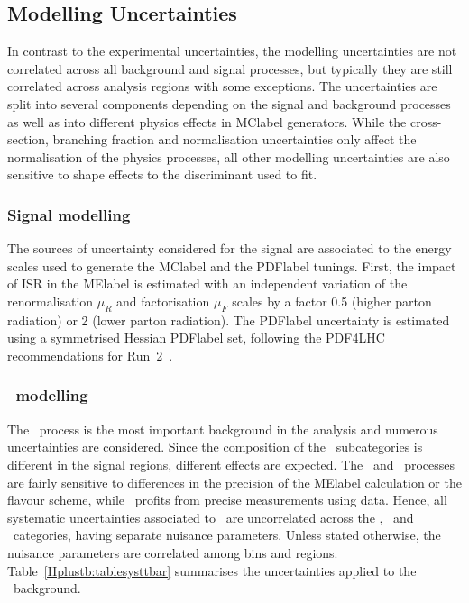 \subsection{Modelling Uncertainties}
In contrast to the experimental uncertainties, the modelling uncertainties are not correlated across all background and signal processes, but typically they are still correlated across analysis regions with some exceptions. The uncertainties are split into several components depending on the signal and background processes as well as into different physics effects in \acrshort{MClabel} generators. While the cross-section, branching fraction and normalisation uncertainties only affect the normalisation of the physics processes, all other modelling uncertainties are also sensitive to shape effects to the discriminant used to fit.


\subsubsection{Signal modelling}

The sources of uncertainty considered for the signal are associated to the energy scales used to generate the \acrshort{MClabel} and the \acrshort{PDFlabel} tunings. First, the impact of ISR in the \acrshort{MElabel} is estimated with an independent variation of the renormalisation $\mu_R$ and factorisation $\mu_F$ scales by a factor 0.5 (higher parton radiation) or 2 (lower parton radiation). The \acrshort{PDFlabel} uncertainty is estimated using a symmetrised Hessian \acrshort{PDFlabel} set, following the PDF4LHC recommendations for Run~2~\cite{Butterworth_2016}.

\subsubsection{\ttbar\ modelling}
\label{Hplustb:Sectionttbarmodelling}
The \ttbar\ process is the most important background in the analysis and numerous uncertainties are considered. Since the composition of the \ttbar\ subcategories is different in the signal regions, different effects are expected. The \ttb\ and \ttc\ processes are fairly sensitive to differences in the precision of the \acrshort{MElabel} calculation or the flavour scheme, while \ttl\ profits from precise measurements using data. Hence, all systematic uncertainties associated to \ttbar\ are uncorrelated across the \ttb, \ttc\ and \ttl\ categories, having separate nuisance parameters. Unless stated otherwise, the nuisance parameters are correlated among bins and regions. Table~\ref{Hplustb:tablesysttbar} summarises the uncertainties applied to the \ttbar\ background.  

